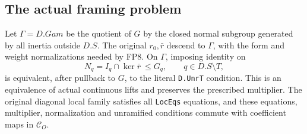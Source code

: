 \subsection{The actual framing problem}

\begin{proposition}
\label{claim:MX1}
Let $\Gamma=D.Gam$ be the quotient of $G$ by the closed normal
subgroup generated by all inertia outside $D.S$.
The original $r_0,\bar r$ descend to $\Gamma$, with the form and
weight normalizations needed by FP8.  On $\Gamma$, imposing
identity on
\[
 N_q=I_q\cap\ker\bar r\ \le G_q,
                       \qquad q\in D.S\setminus T,
 \tag{MX.6}
\]
is equivalent, after pullback to $G$, to the literal
\texttt{D.UnrT} condition.  This is an equivalence of actual
continuous lifts and preserves the prescribed multiplier.
The original diagonal local family satisfies all
\texttt{LocEqs} equations, and these equations, multiplier,
normalization and unramified conditions commute with coefficient
maps in $\mathcal C_O$.
\end{proposition}
